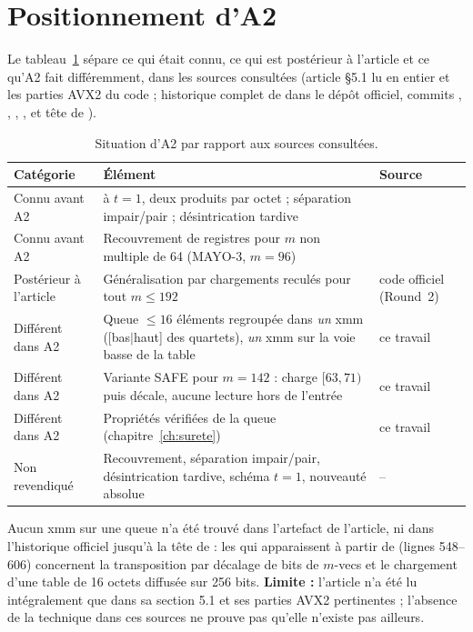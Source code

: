\section{Positionnement d'A2}
Le tableau~\ref{tab:etat} sépare ce qui était connu, ce qui est postérieur à l'article et ce qu'A2 fait différemment, dans les sources consultées (article §5.1 lu en entier et les parties AVX2 du code ; historique complet de  dans le dépôt officiel, commits , , , ,  et tête de  ).

\begin{table}[ht]\centering\small
\caption{Situation d'A2 par rapport aux sources consultées.}\label{tab:etat}
\begin{tabularx}{\linewidth}{@{}lXX@{}}\toprule
Catégorie & Élément & Source\\\midrule
Connu avant A2 & \vpshufb{} à $t=1$, deux produits par octet ; séparation impair/pair ; désintrication tardive & \cite{nibbling}\\
Connu avant A2 & Recouvrement de registres pour $m$ non multiple de 64 (MAYO-3, $m=96$) & \cite{nibbling}\\
Postérieur à l'article & Généralisation par chargements reculés pour tout $m\le192$ & code officiel (Round~2)\\
Différent dans A2 & Queue $\le16$ éléments regroupée dans \emph{un} xmm ([bas$\mid$haut] des quartets), \emph{un} \vpshufb{} xmm sur la voie basse de la table & ce travail\\
Différent dans A2 & Variante SAFE pour $m=142$ : charge $[63,71)$ puis décale, aucune lecture hors de l'entrée & ce travail\\
Différent dans A2 & Propriétés vérifiées de la queue (chapitre~\ref{ch:surete}) & ce travail\\
Non revendiqué & Recouvrement, séparation impair/pair, désintrication tardive, schéma $t=1$, nouveauté absolue & --\\\bottomrule
\end{tabularx}
\end{table}

Aucun  xmm sur une queue n'a été trouvé dans l'artefact de l'article, ni dans l'historique officiel jusqu'à la tête de  : les  qui apparaissent à partir de  (lignes 548--606) concernent la transposition par décalage de bits de $m$-vecs et le chargement d'une table de 16 octets diffusée sur 256 bits. \textbf{Limite :} l'article n'a été lu intégralement que dans sa section 5.1 et ses parties AVX2 pertinentes ; l'absence de la technique dans ces sources ne prouve pas qu'elle n'existe pas ailleurs.

